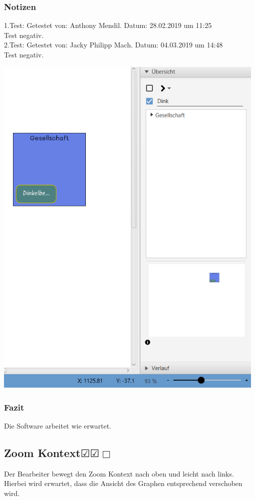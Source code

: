 \documentclass[enabledeprecatedfontcommands]{scrartcl}
\newcommand{\subsectiont}[2]{\subsection[#1]{#1{\normalsize\normalfont #2}}}
\newcommand{\leer}{$\Box$}
\newcommand{\ok}{$\CheckedBox$}
\begin{document}
\subsubsection{Notizen}
1.Test: Getestet von: Anthony Mendil. Datum: 28.02.2019 um 11:25 \\
Test negativ. \\
2.Test: Getestet von: Jacky Philipp Mach. Datum: 04.03.2019 um 14:48 \\
Test negativ.
\begin{center}
\includegraphics[height=17cm]{zoomBar.PNG}
\end{center}
\subsubsection{Fazit}
Die Software arbeitet wie erwartet.

\subsectiont{Zoom Kontext}{\dotfill\ok\ok\leer}
Der Bearbeiter bewegt den Zoom Kontext nach oben und leicht nach links. Hierbei wird erwartet, dass die Ansicht des Graphen entsprechend verschoben wird. 
\end{document}
